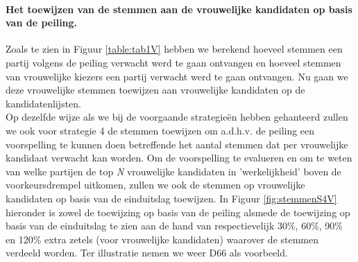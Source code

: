 \paragraph{Het toewijzen van de stemmen aan de vrouwelijke kandidaten op basis van de peiling.}
Zoals te zien in Figuur \ref{table:tab1V} hebben we berekend hoeveel stemmen een partij volgens de peiling verwacht werd te gaan ontvangen en hoeveel stemmen van vrouwelijke kiezers een partij verwacht werd te gaan ontvangen. Nu gaan we deze vrouwelijke stemmen toewijzen aan vrouwelijke kandidaten op de kandidatenlijsten.\\
\indent Op dezelfde wijze als we bij de voorgaande strategie\"{e}n hebben gehanteerd zullen we ook voor strategie 4 de stemmen toewijzen om a.d.h.v. de peiling een voorspelling te kunnen doen betreffende het aantal stemmen dat per vrouwelijke kandidaat verwacht kan worden. Om de voorspelling te evalueren en om te weten van welke partijen de top \textit{N} vrouwelijke kandidaten in 'werkelijkheid' boven de voorkeursdrempel uitkomen, zullen we ook de stemmen op vrouwelijke kandidaten op basis van de einduitslag toewijzen. In Figuur \ref{fig:stemmenS4V} hieronder is zowel de toewijzing op basis van de peiling alsmede de toewijzing op basis van de einduitslag te zien aan de hand van respectievelijk 30\%, 60\%, 90\% en 120\% extra zetels (voor vrouwelijke kandidaten) waarover de stemmen verdeeld worden. Ter illustratie nemen we weer D66 als voorbeeld. \\
